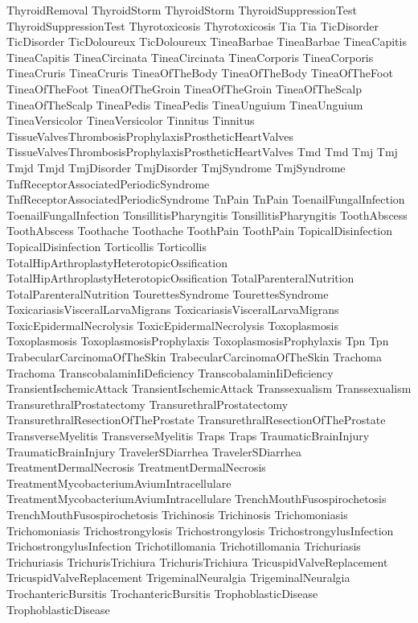  ThyroidRemoval
 ThyroidStorm
 ThyroidStorm
 ThyroidSuppressionTest
 ThyroidSuppressionTest
 Thyrotoxicosis
 Thyrotoxicosis
 Tia
 Tia
 TicDisorder
 TicDisorder
 TicDoloureux
 TicDoloureux
 TineaBarbae
 TineaBarbae
 TineaCapitis
 TineaCapitis
 TineaCircinata
 TineaCircinata
 TineaCorporis
 TineaCorporis
 TineaCruris
 TineaCruris
 TineaOfTheBody
 TineaOfTheBody
 TineaOfTheFoot
 TineaOfTheFoot
 TineaOfTheGroin
 TineaOfTheGroin
 TineaOfTheScalp
 TineaOfTheScalp
 TineaPedis
 TineaPedis
 TineaUnguium
 TineaUnguium
 TineaVersicolor
 TineaVersicolor
 Tinnitus
 Tinnitus
 TissueValvesThrombosisProphylaxisProstheticHeartValves
 TissueValvesThrombosisProphylaxisProstheticHeartValves
 Tmd
 Tmd
 Tmj
 Tmj
 Tmjd
 Tmjd
 TmjDisorder
 TmjDisorder
 TmjSyndrome
 TmjSyndrome
 TnfReceptorAssociatedPeriodicSyndrome
 TnfReceptorAssociatedPeriodicSyndrome
 TnPain
 TnPain
 ToenailFungalInfection
 ToenailFungalInfection
 TonsillitisPharyngitis
 TonsillitisPharyngitis
 ToothAbscess
 ToothAbscess
 Toothache
 Toothache
 ToothPain
 ToothPain
 TopicalDisinfection
 TopicalDisinfection
 Torticollis
 Torticollis
 TotalHipArthroplastyHeterotopicOssification
 TotalHipArthroplastyHeterotopicOssification
 TotalParenteralNutrition
 TotalParenteralNutrition
 TourettesSyndrome
 TourettesSyndrome
 ToxicariasisVisceralLarvaMigrans
 ToxicariasisVisceralLarvaMigrans
 ToxicEpidermalNecrolysis
 ToxicEpidermalNecrolysis
 Toxoplasmosis
 Toxoplasmosis
 ToxoplasmosisProphylaxis
 ToxoplasmosisProphylaxis
 Tpn
 Tpn
 TrabecularCarcinomaOfTheSkin
 TrabecularCarcinomaOfTheSkin
 Trachoma
 Trachoma
 TranscobalaminIiDeficiency
 TranscobalaminIiDeficiency
 TransientIschemicAttack
 TransientIschemicAttack
 Transsexualism
 Transsexualism
 TransurethralProstatectomy
 TransurethralProstatectomy
 TransurethralResectionOfTheProstate
 TransurethralResectionOfTheProstate
 TransverseMyelitis
 TransverseMyelitis
 Traps
 Traps
 TraumaticBrainInjury
 TraumaticBrainInjury
 TravelerSDiarrhea
 TravelerSDiarrhea
 TreatmentDermalNecrosis
 TreatmentDermalNecrosis
 TreatmentMycobacteriumAviumIntracellulare
 TreatmentMycobacteriumAviumIntracellulare
 TrenchMouthFusospirochetosis
 TrenchMouthFusospirochetosis
 Trichinosis
 Trichinosis
 Trichomoniasis
 Trichomoniasis
 Trichostrongylosis
 Trichostrongylosis
 TrichostrongylusInfection
 TrichostrongylusInfection
 Trichotillomania
 Trichotillomania
 Trichuriasis
 Trichuriasis
 TrichurisTrichiura
 TrichurisTrichiura
 TricuspidValveReplacement
 TricuspidValveReplacement
 TrigeminalNeuralgia
 TrigeminalNeuralgia
 TrochantericBursitis
 TrochantericBursitis
 TrophoblasticDisease
 TrophoblasticDisease
